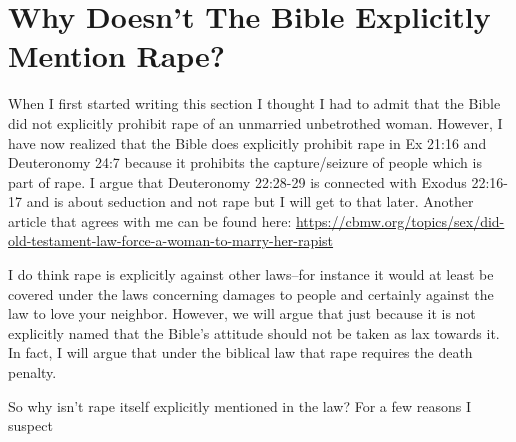 \documentclass[11pt]{article}
\begin{document}
\section{Why Doesn't The Bible Explicitly Mention Rape?} \label{bible mention rape}
 When I first started writing this section I thought I had to admit that the Bible did not explicitly prohibit rape of an unmarried unbetrothed woman. However, I have now realized that the Bible does explicitly prohibit rape in Ex 21:16 and Deuteronomy 24:7 because it prohibits the capture/seizure of people which is part of rape. I argue that Deuteronomy 22:28-29 is connected with Exodus 22:16-17 and is about seduction and not rape but I will get to that later. Another article that agrees with me can be found here: \url{https://cbmw.org/topics/sex/did-old-testament-law-force-a-woman-to-marry-her-rapist}

I do think rape is explicitly against other laws–for instance it would at least be covered under the laws concerning damages to people and certainly against the law to love your neighbor. However, we will argue that just because it is not explicitly named that the Bible’s attitude should not be taken as lax towards it. In fact, I will argue that under the biblical law that rape requires the death penalty.

So why isn’t rape itself explicitly mentioned in the law? For a few reasons I suspect
\end{document}
